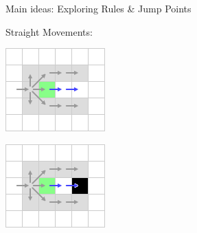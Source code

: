\documentclass{presentation}
\begin{document}
\begin{frame}{Main ideas: Exploring Rules \& Jump Points}
		\begin{center}
		Straight Movements:\\
		\vspace{5mm}
		\begin{minipage}{0.3\textwidth}
			\includegraphics[width=\textwidth]{figures/extra_geschnitten/sm(long).png}
		\end{minipage}%
		\hfill%
		\begin{minipage}{0.3\textwidth}
			\includegraphics[width=\textwidth]{figures/extra_geschnitten/sm(obstacle).png}

\end{minipage}
\end{center}
\end{frame}
\end{document}
